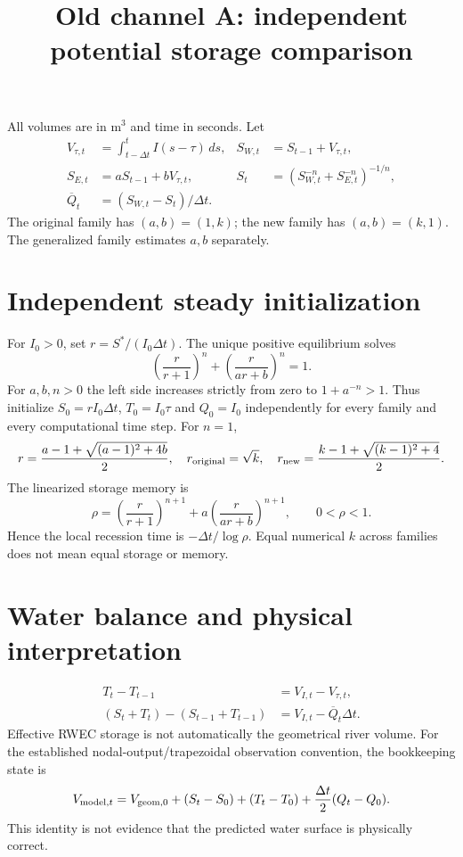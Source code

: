 \documentclass[11pt]{article}
\title{Old channel A: independent potential storage comparison}
\date{}
\begin{document}
\maketitle
All volumes are in $\mathrm{m^3}$ and time in seconds. Let
\begin{align}
V_{\tau,t}&=\int_{t-\Delta t}^t I(s-\tau)\,ds, & S_{W,t}&=S_{t-1}+V_{\tau,t},\\
S_{E,t}&=aS_{t-1}+bV_{\tau,t}, & S_t&=(S_{W,t}^{-n}+S_{E,t}^{-n})^{-1/n},\\
\overline Q_t&=(S_{W,t}-S_t)/\Delta t.
\end{align}
The original family has $(a,b)=(1,k)$; the new family has $(a,b)=(k,1)$. The generalized family estimates $a,b$ separately.
\section*{Independent steady initialization}
For $I_0>0$, set $r=S^*/(I_0\Delta t)$. The unique positive equilibrium solves
\begin{equation}
\left(\frac{r}{r+1}\right)^n+\left(\frac{r}{ar+b}\right)^n=1.
\end{equation}
For $a,b,n>0$ the left side increases strictly from zero to $1+a^{-n}>1$. Thus initialize $S_0=rI_0\Delta t$, $T_0=I_0\tau$ and $Q_0=I_0$ independently for every family and every computational time step.
For $n=1$,
\begin{equation}
r=\frac{a-1+\sqrt{(a-1)^2+4b}}{2},\quad r_{\rm original}=\sqrt{k},\quad r_{\rm new}=\frac{k-1+\sqrt{(k-1)^2+4}}{2}.
\end{equation}
The linearized storage memory is
\begin{equation}
\rho=\left(\frac{r}{r+1}\right)^{n+1}+a\left(\frac{r}{ar+b}\right)^{n+1},\qquad 0<\rho<1.
\end{equation}
Hence the local recession time is $-\Delta t/\log\rho$. Equal numerical $k$ across families does not mean equal storage or memory.
\section*{Water balance and physical interpretation}
\begin{align}
T_t-T_{t-1}&=V_{I,t}-V_{\tau,t},\\
(S_t+T_t)-(S_{t-1}+T_{t-1})&=V_{I,t}-\overline Q_t\Delta t.
\end{align}
Effective RWEC storage is not automatically the geometrical river volume. For the established nodal-output/trapezoidal observation convention, the bookkeeping state is
\begin{equation}
V_{{\rm model},t}=V_{{\rm geom},0}+(S_t-S_0)+(T_t-T_0)+\frac{\Delta t}{2}(Q_t-Q_0).
\end{equation}
This identity is not evidence that the predicted water surface is physically correct.
\end{document}
